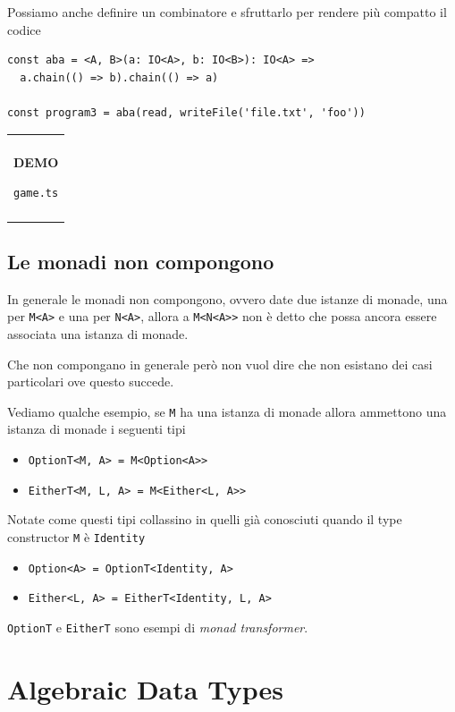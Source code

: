 \documentclass[12pt]{article}
\newenvironment{demo}
    {\begin{center}
    \begin{tabular}{|p{0.9\textwidth}|}
    \hline\\
    }
    {
    \\\\\hline
    \end{tabular}
    \end{center}
    }
\begin{document}
Possiamo anche definire un combinatore e sfruttarlo per rendere più compatto il codice

\begin{verbatim}
const aba = <A, B>(a: IO<A>, b: IO<B>): IO<A> =>
  a.chain(() => b).chain(() => a)

const program3 = aba(read, writeFile('file.txt', 'foo'))
\end{verbatim}

\begin{demo}
\begin{center}
\textbf{DEMO}

\texttt{game.ts}
\end{center}
\end{demo}

\subsection{Le monadi non compongono}

In generale le monadi non compongono, ovvero date due istanze di monade, una per \texttt{M<A>} e una per \texttt{N<A>},
allora a \texttt{M<N<A>>} non è detto che possa ancora essere associata una istanza di monade.

Che non compongano in generale però non vuol dire che non esistano dei casi particolari ove questo succede.

Vediamo qualche esempio, se \texttt{M} ha una istanza di monade allora ammettono una istanza di monade i seguenti tipi

\begin{itemize}
  \item \texttt{OptionT<M, A> = M<Option<A>>}
  \item \texttt{EitherT<M, L, A> = M<Either<L, A>>}
\end{itemize}

Notate come questi tipi collassino in quelli già conosciuti quando il type constructor \texttt{M} è \texttt{Identity}

\begin{itemize}
  \item \texttt{Option<A> = OptionT<Identity, A>}
  \item \texttt{Either<L, A> = EitherT<Identity, L, A>}
\end{itemize}

\texttt{OptionT} e \texttt{EitherT} sono esempi di \emph{monad transformer}.

\newpage

\section{Algebraic Data Types}
\end{document}

